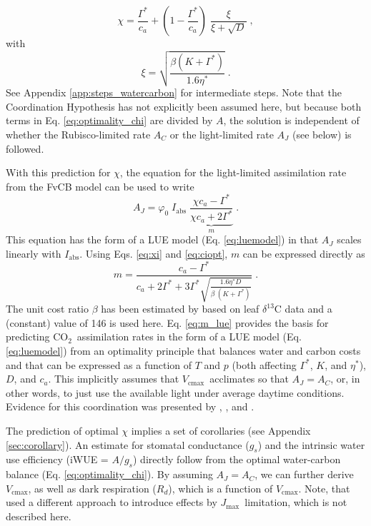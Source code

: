 \documentclass{myreport}
\newcommand{\coo}{CO$_2$}
\newcommand{\vcmax}{$V_{\text{cmax}}$}
\newcommand{\jmax}{$J_{\text{max}}$}
\begin{document}
\begin{equation}
\label{eq:chiopt}
\chi = \frac{\Gamma^{\ast}}{c_a} + \left(1- \frac{\Gamma^{\ast}}{c_a}\right)\;\frac{\xi}{\xi + \sqrt{D}}\;,
\end{equation}
with 
\begin{equation}
\label{eq:xi}
\xi = \sqrt{\frac{\beta (K+\Gamma^{\ast})}{1.6 \eta^{\ast}}}\;.
\end{equation}
See Appendix \ref{app:steps_watercarbon} for intermediate steps. Note that the Coordination Hypothesis has not explicitly been assumed here, but because both terms in Eq. \ref{eq:optimality_chi} are divided by $A$, the solution is independent of whether the Rubisco-limited rate $A_C$ or the light-limited rate $A_J$ (see below) is followed.

With this prediction for $\chi$, the equation for the light-limited assimilation rate from the FvCB model can be used to write
\begin{equation}
\label{eq:aj}
        A_J = \varphi_0 \; I_{\mathrm{abs}}\;\underbrace{\frac{\chi c_a - \Gamma^{\ast}}{\chi c_a + 2\Gamma^{\ast}}}_{m} \;.
\end{equation}
This equation has the form of a LUE model (Eq. \ref{eq:luemodel}) in that $A_J$ scales linearly with $I_{\mathrm{abs}}$. Using Eqs. \ref{eq:xi} and \ref{eq:ciopt}, $m$ can be expressed directly as
\begin{equation}
\label{eq:m_lue}
    m = \frac{c_a - \Gamma^{\ast}}{c_a + 2 \Gamma^{\ast} + 3 \Gamma^{\ast} \sqrt{\frac{1.6 \eta^{\ast} D }{\beta\;(K+\Gamma^{\ast})}}} \;.
\end{equation}
The unit cost ratio $\beta$ has been estimated by \cite{wang17natpl} based on leaf $\delta^{13}$C data and a (constant) value of 146 is used here. Eq. \ref{eq:m_lue} provides the basis for predicting \coo\ assimilation rates in the form of a LUE model (Eq. \ref{eq:luemodel}) from an optimality principle that balances water and carbon costs and that can be expressed as a function of $T$ and $p$ (both affecting $\Gamma^{\ast}$, $K$, and $\eta^\ast$), $D$, and $c_a$. This implicitly assumes that \vcmax\ acclimates so that $A_J=A_C$, or, in other words, to just use the available light under average daytime conditions. Evidence for this coordination was presented by \cite{chen93}, \cite{haxeltine96}, and \cite{maire12po}. 

The prediction of optimal $\chi$ implies a set of corollaries (see Appendix \ref{sec:corollary}). An estimate for stomatal conductance ($g_s$) and the intrinsic water use efficiency (iWUE = $A/g_s$) directly follow from the optimal water-carbon balance (Eq. \ref{eq:optimality_chi}). By assuming $A_J=A_C$, we can further derive \vcmax , as well as dark respiration ($R_d$), which is a function of \vcmax . Note, that \cite{smith19ecollett} used a different approach to introduce effects by \jmax\ limitation, which is not described here.
\end{document}

